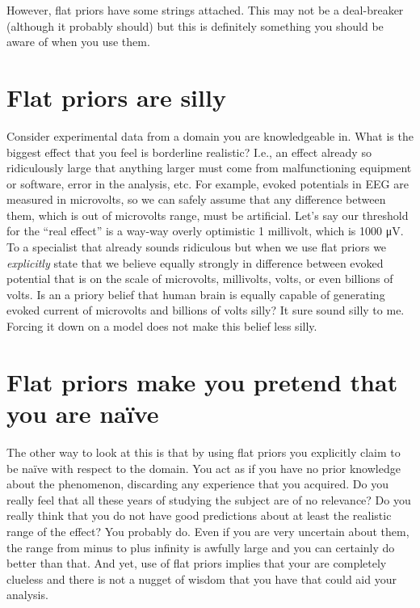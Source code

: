 \documentclass[
]{book}
\begin{document}
However, flat priors have some strings attached. This may not be a deal-breaker (although it probably should) but this is definitely something you should be aware of when you use them.

\hypertarget{flat-priors-are-silly}{%
\section{Flat priors are silly}\label{flat-priors-are-silly}}

Consider experimental data from a domain you are knowledgeable in. What is the biggest effect that you feel is borderline realistic? I.e., an effect already so ridiculously large that anything larger must come from malfunctioning equipment or software, error in the analysis, etc. For example, evoked potentials in EEG are measured in microvolts, so we can safely assume that any difference between them, which is out of microvolts range, must be artificial. Let's say our threshold for the ``real effect'' is a way-way overly optimistic 1 millivolt, which is 1000 μV. To a specialist that already sounds ridiculous but when we use flat priors we \emph{explicitly} state that we believe equally strongly in difference between evoked potential that is on the scale of microvolts, millivolts, volts, or even billions of volts. Is an a priory belief that human brain is equally capable of generating evoked current of microvolts and billions of volts silly? It sure sound silly to me. Forcing it down on a model does not make this belief less silly.

\hypertarget{flat-priors-make-you-pretend-that-you-are-nauxefve}{%
\section{Flat priors make you pretend that you are naïve}\label{flat-priors-make-you-pretend-that-you-are-nauxefve}}

The other way to look at this is that by using flat priors you explicitly claim to be naïve with respect to the domain. You act as if you have no prior knowledge about the phenomenon, discarding any experience that you acquired. Do you really feel that all these years of studying the subject are of no relevance? Do you really think that you do not have good predictions about at least the realistic range of the effect? You probably do. Even if you are very uncertain about them, the range from minus to plus infinity is awfully large and you can certainly do better than that. And yet, use of flat priors implies that your are completely clueless and there is not a nugget of wisdom that you have that could aid your analysis.
\end{document}
